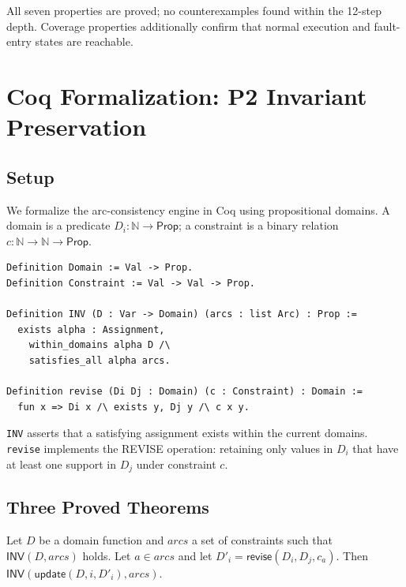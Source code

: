 \documentclass[sigplan,10pt,review]{acmart}
\begin{document}
All seven properties are proved; no counterexamples found within the 12-step depth.
Coverage properties additionally confirm that normal execution and fault-entry
states are reachable.

\section{Coq Formalization: P2 Invariant Preservation}
\label{sec:coq}

\subsection{Setup}

We formalize the arc-consistency engine in Coq using propositional domains.
A domain is a predicate $D_i : \mathbb{N} \to \mathsf{Prop}$; a constraint is a
binary relation $c : \mathbb{N} \to \mathbb{N} \to \mathsf{Prop}$.

\begin{lstlisting}[style=coqcode,caption={Core domain and constraint types.},label={lst:coq-types}]
Definition Domain := Val -> Prop.
Definition Constraint := Val -> Val -> Prop.

Definition INV (D : Var -> Domain) (arcs : list Arc) : Prop :=
  exists alpha : Assignment,
    within_domains alpha D /\
    satisfies_all alpha arcs.

Definition revise (Di Dj : Domain) (c : Constraint) : Domain :=
  fun x => Di x /\ exists y, Dj y /\ c x y.
\end{lstlisting}

\noindent \texttt{INV} asserts that a satisfying assignment exists within the
current domains. \texttt{revise} implements the REVISE operation: retaining only
values in $D_i$ that have at least one support in $D_j$ under constraint $c$.

\subsection{Three Proved Theorems}

\begin{theorem}
\label{thm:revise}
Let $D$ be a domain function and $\mathit{arcs}$ a set of constraints such that
$\mathsf{INV}(D, \mathit{arcs})$ holds. Let $a \in \mathit{arcs}$ and let
$D'_i = \mathsf{revise}(D_i, D_j, c_a)$. Then
$\mathsf{INV}(\mathsf{update}(D, i, D'_i), \mathit{arcs})$.
\end{theorem}
\end{document}
